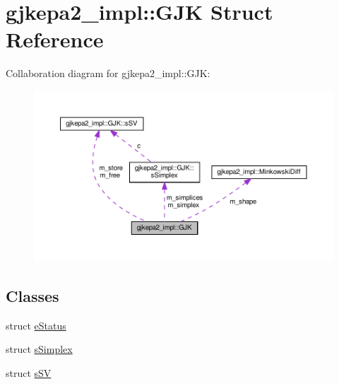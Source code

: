 \hypertarget{structgjkepa2__impl_1_1GJK}{}\section{gjkepa2\+\_\+impl\+:\+:G\+JK Struct Reference}
\label{structgjkepa2__impl_1_1GJK}


Collaboration diagram for gjkepa2\+\_\+impl\+:\+:G\+JK\+:
\nopagebreak
\begin{figure}[H]
\begin{center}
\leavevmode
\includegraphics[width=350pt]{structgjkepa2__impl_1_1GJK__coll__graph}
\end{center}
\end{figure}
\subsection*{Classes}
\begin{DoxyCompactItemize}
\item 
struct \hyperlink{structgjkepa2__impl_1_1GJK_1_1eStatus}{e\+Status}
\item 
struct \hyperlink{structgjkepa2__impl_1_1GJK_1_1sSimplex}{s\+Simplex}
\item 
struct \hyperlink{structgjkepa2__impl_1_1GJK_1_1sSV}{s\+SV}
\end{DoxyCompactItemize}
